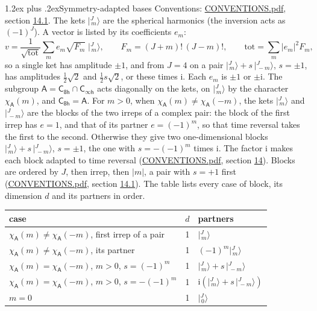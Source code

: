 \documentclass[10pt,a4paper]{article}
\makeatletter
\renewcommand\section{\@startsection{section}{1}{\z@}{-3ex plus -1ex minus -.2ex}%
  {1.2ex plus .2ex}{\normalfont\large\sffamily\bfseries\color{parttitle}}}
\numberwithin{equation}{section}
\newcommand{\grp}[1]{\mathsf{#1}}
\newcommand{\iunit}{\mathrm{i}}
\newcommand{\chiA}{\chi_{\grp{A}}}
\newcommand{\jm}[2]{\bigl\lvert{}^{#1}_{\,#2}\bigr\rangle}
\makeatother
\begin{document}
\section{Symmetry-adapted bases}\label{s:bases}
Conventions: \href{../../CONVENTIONS.pdf}{CONVENTIONS.pdf}, section \href{../../CONVENTIONS.pdf\#conv.14.1}{14.1}.
\leavevmode\label{n:index.m}\label{n:vector.ket}The kets $\jm{J}{m}$ are the spherical harmonics (the inversion acts as $(-1)^J$). \label{n:index.ketcoefficient}\label{n:vector.basis.symmetry}\label{n:index.ketweight}\label{n:index.total}A vector is listed by its coefficients $e_m$:
\begin{equation}\label{e:ket}v = \frac{1}{\sqrt{\mathrm{tot}}}\sum_m e_m\sqrt{F_m}\;\jm{J}{m},\qquad F_m = (J+m)!\,(J-m)!,\qquad \mathrm{tot} = \sum_m |e_m|^2F_m,\end{equation}
\leavevmode\label{n:index.pair.sign}so a single ket has amplitude $\pm1$, and from $J = 4$ on a pair $\jm{J}{m} + s\,\jm{J}{-m}$, $s = \pm1$, has amplitudes $\tfrac{1}{2}\sqrt{2}$ and $\tfrac{1}{2}s\sqrt{2}$, or these times $\iunit$. Each $e_m$ is $\pm1$ or $\pm\iunit$.
\leavevmode\label{n:group.A}\label{n:function.character.abelian}The subgroup $\grp{A} = \grp{C_{8h}}\cap\grp{C_{\infty h}}$ acts diagonally on the kets, on $\jm{J}{m}$ by the character $\chiA(m)$, and $\grp{C_{8h}} = \grp{A}$. For $m > 0$, when $\chiA(m) \ne \chiA(-m)$, the kets $\jm{J}{m}$ and $\jm{J}{-m}$ are the blocks of the two irreps of a complex pair: the block of the first irrep has $e = 1$, and that of its partner $e = (-1)^m$, so that time reversal takes the first to the second. Otherwise they give two one-dimensional blocks $\jm{J}{m} + s\,\jm{J}{-m}$, $s = \pm1$, the one with $s = -(-1)^m$ times $\iunit$. The factor $\iunit$ makes each block adapted to time reversal (\href{../../CONVENTIONS.pdf}{CONVENTIONS.pdf}, section \href{../../CONVENTIONS.pdf\#conv.14}{14}). Blocks are ordered by $J$, then irrep, then $|m|$, a pair with $s = +1$ first (\href{../../CONVENTIONS.pdf}{CONVENTIONS.pdf}, section \href{../../CONVENTIONS.pdf\#conv.14.1}{14.1}).
\leavevmode\label{n:head.case}\label{n:head.partners}The table lists every case of block, its dimension $d$ and its partners in order.
\begin{center}\begin{tabular}{@{}lrl@{}}\toprule
case & $d$ & partners\\\midrule
$\chiA(m) \ne \chiA(-m)$, first irrep of a pair & 1 & $\jm{J}{m}$\\
$\chiA(m) \ne \chiA(-m)$, its partner & 1 & $(-1)^m\jm{J}{m}$\\
$\chiA(m) = \chiA(-m)$, $m > 0$, $s = (-1)^m$ & 1 & $\jm{J}{m} + s\,\jm{J}{-m}$\\
$\chiA(m) = \chiA(-m)$, $m > 0$, $s = -(-1)^m$ & 1 & $\iunit(\jm{J}{m} + s\,\jm{J}{-m})$\\
$m = 0$ & 1 & $\jm{J}{0}$\\
\bottomrule\end{tabular}\end{center}
\end{document}
